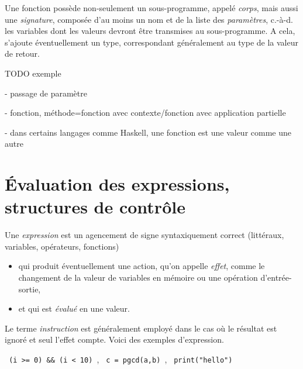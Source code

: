 \documentclass[a4paper,francais]{insalyon}
\newcommand{\cad}{c.-à-d.}
\begin{document}
Une fonction possède non-seulement un sous-programme, appelé \emph{corps}, mais aussi une \emph{signature}, composée d'au moins un nom et de la liste des \emph{paramètres}, {\cad} les variables dont les valeurs devront être transmises au sous-programme. A cela, s'ajoute éventuellement un type, correspondant généralement au type de la valeur de retour. 

TODO exemple

- passage de paramètre

- fonction, méthode=fonction avec contexte/fonction avec application partielle

- dans certains langages comme Haskell, une fonction est une valeur comme une autre


\section{\'Evaluation des expressions, structures de contrôle}



Une \emph{expression} est un agencement de signe syntaxiquement correct (littéraux, variables, opérateurs, fonctions)
\begin{itemize}
\item qui produit éventuellement une action, qu'on appelle \emph{effet}, comme le changement de la valeur de variables en mémoire ou une opération d'entrée-sortie, 
\item et qui est \emph{évalué} en une valeur. 
\end{itemize}
Le terme \emph{instruction} est généralement employé dans le cas où le résultat est ignoré et seul l'effet compte.
Voici des exemples d'expression. 

\verb! (i >= 0) && (i < 10) !, \verb! c = pgcd(a,b) !, \verb! print("hello") !

\end{document}
